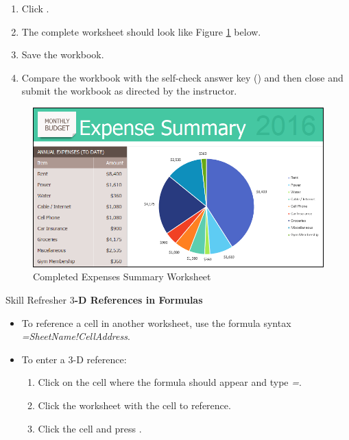 \begin{enumbox}
\begin{enumerate}
		\item Click .
		\item The complete  worksheet should look like Figure \ref{06:fig08} below.
		\item Save the  workbook. 
		\item Compare the workbook with the self-check answer key () and then close and submit the  workbook as directed by the instructor.
	\end{enumerate}
\end{enumbox}
	
\begin{figure}[H]
	\centering
	\includegraphics[width=\maxwidth{.95\linewidth}]{gfx/ch06_fig08}
	\caption{Completed Expenses Summary Worksheet}
	\label{06:fig08}
\end{figure}

\begin{center}
	\begin{sklbox}{Skill Refresher}
		\textbf{$ 3 $-D References in Formulas}
		\\
		\begin{itemize}
			\setlength{\itemsep}{0pt}
			\setlength{\parskip}{0pt}
			\setlength{\parsep}{0pt}
			
			\item To reference a cell in another worksheet, use the formula syntax \textit{=SheetName!CellAddress}.
			\bigskip
			\item To enter a $ 3 $-D reference:

			\begin{enumerate}
				\item Click on the cell where the formula should appear and type \textit{=}.
				\item Click the worksheet with the cell to reference.
				\item Click the cell and press .
			\end{enumerate}
			
		\end{itemize}
	\end{sklbox}
\end{center}

